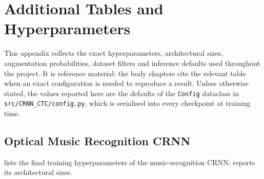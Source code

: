 \chapter{Additional Tables and Hyperparameters}
\label{app:hyperparams}

This appendix collects the exact hyperparameters, architectural sizes, augmentation probabilities, dataset filters and inference defaults used throughout the project. It is reference material: the body chapters cite the relevant table when an exact configuration is needed to reproduce a result. Unless otherwise stated, the values reported here are the defaults of the \texttt{Config} dataclass in \texttt{src/CRNN\_CTC/config.py}, which is serialised into every checkpoint at training time.

\section{Optical Music Recognition CRNN}

 lists the final training hyperparameters of the music-recognition CRNN;  reports its architectural sizes.

